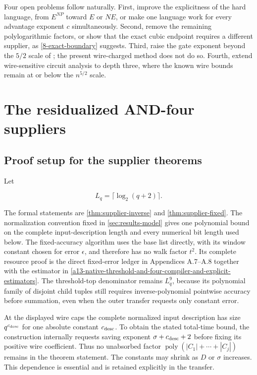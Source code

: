 \documentclass[11pt,letterpaper]{article}
\newcommand{\cref}[1]{\ref{#1}}
\theoremstyle{definition}
\theoremstyle{remark}
\newcommand{\poly}{\operatorname{poly}}
\begin{document}
Four open problems follow naturally. First, improve the explicitness of
the hard language, from \(E^{NP}\) toward \(E\) or \(NE\), or make one
language work for every advantage exponent \(c\) simultaneously. Second,
remove the remaining polylogarithmic factors, or show that the exact
cubic endpoint requires a different supplier, as
\cref{8-exact-boundary} suggests. Third, raise the gate exponent beyond
the \(5/2\) scale of \cite{CTW26}; the present wire-charged method does
not do so. Fourth, extend wire-sensitive circuit analysis to depth
three, where the known wire bounds \cite{KW16,KKL17} remain at or below
the \(n^{5/2}\) scale.

\appendix
\section{The residualized AND-four
suppliers}\label{appendix-a-the-residualized-and-four-suppliers}

\subsection{Proof setup for the supplier theorems}\label{a1-supplier-theorem}

Let

\[
L_q=\lceil\log_2(q+2)\rceil.
\]

The formal statements are \cref{thm:supplier-inverse} and
\cref{thm:supplier-fixed}.
The normalization convention fixed in \cref{sec:results-model} gives one
polynomial bound on the complete input-description length and every numerical
bit length used below. The fixed-accuracy algorithm uses the base list
directly, with its window constant chosen
for error \(\epsilon\), and therefore has no walk factor \(t^2\). Its
complete resource proof is the direct fixed-error ledger in Appendices
A.7--A.8 together with the estimator in
\cref{a13-native-threshold-and-four-compiler-and-explicit-estimators}. The
threshold-top denominator remains \(L_q^9\), because its polynomial
family of disjoint child tuples still requires inverse-polynomial
pointwise accuracy before summation, even when the outer transfer
requests only constant error.

At the displayed wire caps the complete normalized input description has
size \(q^{c_{\rm desc}}\) for one absolute constant \(c_{\rm desc}\). To
obtain the stated total-time bound, the construction internally requests
saving exponent \(\sigma+c_{\rm desc}+2\) before fixing its positive wire
coefficient. Thus no unabsorbed factor \(\poly(|C_1|+\cdots+|C_j|)\) remains
in the theorem statement. The constants may shrink as \(D\) or \(\sigma\)
increases. This
dependence is essential and is retained explicitly in the transfer.
\end{document}
